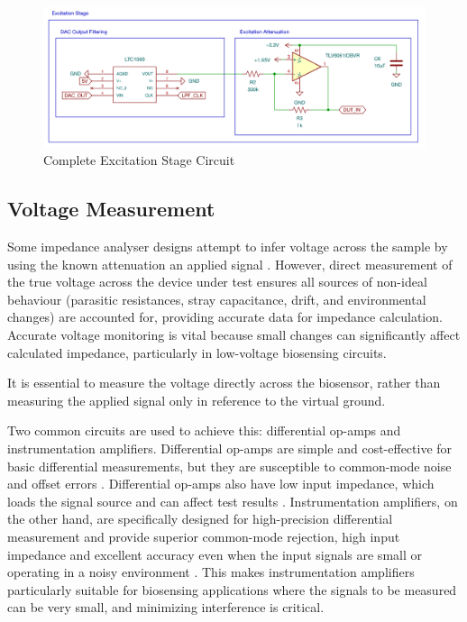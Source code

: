 
\begin{figure}[]
    \centering
    \includegraphics[width=\textwidth]{ExcitationSchem.png}
    \caption{Complete Excitation Stage Circuit}
    \label{fig:excitation_stage_circuit}
\end{figure}

\subsection{Voltage Measurement}
Some impedance analyser designs attempt to infer voltage across the sample by using the known attenuation an applied signal \cite{buscagliaSimpleZLowCostPortable2023}. However, direct measurement of the true voltage across the device under test ensures all sources of non-ideal behaviour (parasitic resistances, stray capacitance, drift, and environmental changes) are accounted for, providing accurate data for impedance calculation. Accurate voltage monitoring is vital because small changes can significantly affect calculated impedance, particularly in low-voltage biosensing circuits.

It is essential to measure the voltage directly across the biosensor, rather than measuring the applied signal only in reference to the virtual ground.  

Two common circuits are used to achieve this: differential op-amps and instrumentation amplifiers. Differential op-amps are simple and cost-effective for basic differential measurements, but they are susceptible to common-mode noise and offset errors \cite{technologyWhatAreDrawbacks2024}. Differential op-amps also have low input impedance, which loads the signal source and can affect test results \cite{technologyWhatAreDrawbacks2024}. Instrumentation amplifiers, on the other hand, are specifically designed for high-precision differential measurement and provide superior common-mode rejection, high input impedance and excellent accuracy even when the input signals are small or operating in a noisy environment \cite{InstrumentationAmplifierOperational}. This makes instrumentation amplifiers particularly suitable for biosensing applications where the signals to be measured can be very small, and minimizing interference is critical.

